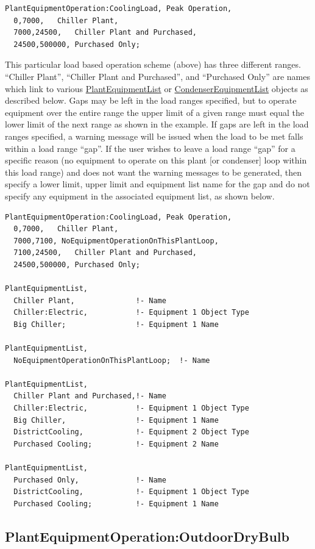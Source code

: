 \begin{lstlisting}
PlantEquipmentOperation:CoolingLoad, Peak Operation,
  0,7000,   Chiller Plant,
  7000,24500,   Chiller Plant and Purchased,
  24500,500000, Purchased Only;
\end{lstlisting}

This particular load based operation scheme (above) has three different ranges. ``Chiller Plant'', ``Chiller Plant and Purchased'', and ``Purchased Only'' are names which link to various \hyperref[plantequipmentlist]{PlantEquipmentList} or \hyperref[condenserequipmentlist]{CondenserEquipmentList} objects as described below. Gaps may be left in the load ranges specified, but to operate equipment over the entire range the upper limit of a given range must equal the lower limit of the next range as shown in the example. If gaps are left in the load ranges specified, a warning message will be issued when the load to be met falls within a load range ``gap''. If the user wishes to leave a load range ``gap'' for a specific reason (no equipment to operate on this plant {[}or condenser{]} loop within this load range) and does not want the warning messages to be generated, then specify a lower limit, upper limit and equipment list name for the gap and do not specify any equipment in the associated equipment list, as shown below.

\begin{lstlisting}
PlantEquipmentOperation:CoolingLoad, Peak Operation,
  0,7000,   Chiller Plant,
  7000,7100, NoEquipmentOperationOnThisPlantLoop,
  7100,24500,   Chiller Plant and Purchased,
  24500,500000, Purchased Only;

PlantEquipmentList,
  Chiller Plant,              !- Name
  Chiller:Electric,           !- Equipment 1 Object Type
  Big Chiller;                !- Equipment 1 Name

PlantEquipmentList,
  NoEquipmentOperationOnThisPlantLoop;  !- Name

PlantEquipmentList,
  Chiller Plant and Purchased,!- Name
  Chiller:Electric,           !- Equipment 1 Object Type
  Big Chiller,                !- Equipment 1 Name
  DistrictCooling,            !- Equipment 2 Object Type
  Purchased Cooling;          !- Equipment 2 Name

PlantEquipmentList,
  Purchased Only,             !- Name
  DistrictCooling,            !- Equipment 1 Object Type
  Purchased Cooling;          !- Equipment 1 Name
\end{lstlisting}

\subsection{PlantEquipmentOperation:OutdoorDryBulb}\label{plantequipmentoperationoutdoordrybulb}

